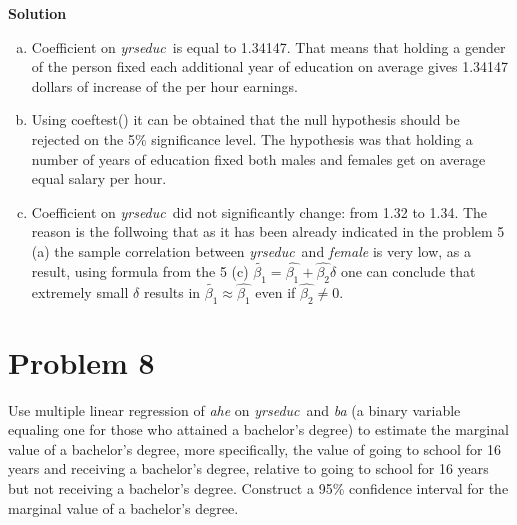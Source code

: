 \documentclass[a4paper]{article}
\newcommand{\yrseduc}{\textit{yrseduc}}
\begin{document}
\textbf{Solution}

\begin{enumerate}[(a)]
	\item Coefficient on \yrseduc\ is equal to 1.34147. That means that holding a gender of the person fixed each additional year of education on average gives 1.34147 dollars of increase of the per hour earnings.
	\item Using coeftest() it can be obtained that the null hypothesis should be rejected on the 5\% significance level. The hypothesis was that holding a number of years of education fixed both males and females get on average equal salary per hour.
	\item Coefficient on \yrseduc\ did not significantly change: from 1.32 to 1.34. The reason is the follwoing that as it has been already indicated in the problem 5 (a) the sample correlation between \yrseduc\ and \textit{female} is very low, as a result, using formula from the 5 (c) $\tilde{\beta_1} = \hat{\beta_1} + \hat{\beta_2} \delta$ one can conclude that extremely small $\delta$ results in $\tilde{\beta_1} \approx \hat{\beta_1}$ even if $\hat{\beta_2} \neq 0$.
\end{enumerate}
\section*{Problem 8}
Use multiple linear regression of \textit{ahe} on \yrseduc\ and \textit{ba} (a binary variable equaling one for
those who attained a bachelor’s degree) to estimate the marginal value of a bachelor’s degree,
more specifically, the value of going to school for 16 years and receiving a bachelor’s degree,
relative to going to school for 16 years but not receiving a bachelor’s degree. Construct a 95\%
confidence interval for the marginal value of a bachelor’s degree.
\end{document}
